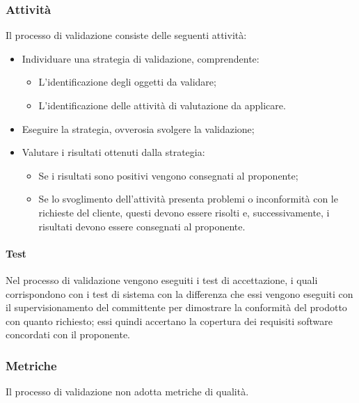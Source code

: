 \documentclass[../norme-di-progetto.tex]{subfiles}
\begin{document}
\subsubsection{Attività}
Il processo di validazione consiste delle seguenti attività:
\begin{itemize}
  \item Individuare una strategia di validazione, comprendente:
  \begin{itemize}
    \item L'identificazione degli oggetti da validare;
    \item L'identificazione delle attività di valutazione da applicare.
  \end{itemize}
  \item Eseguire la strategia, ovverosia svolgere la validazione;
  \item Valutare i risultati ottenuti dalla strategia:
  \begin{itemize}
    \item Se i risultati sono positivi vengono consegnati al proponente;
    \item Se lo svoglimento dell'attività presenta problemi o inconformità con le richieste del cliente, questi devono essere risolti e, successivamente, i risultati devono essere consegnati al proponente.
  \end{itemize}
\end{itemize}
\paragraph{Test}
Nel processo di validazione vengono eseguiti i test di accettazione, i quali corrispondono con i test di sistema con la differenza che essi vengono eseguiti con il supervisionamento del committente per dimostrare la conformità del prodotto con quanto richiesto; essi quindi accertano la copertura dei requisiti software concordati con il proponente.

\subsubsection{Metriche}
Il processo di validazione non adotta metriche di qualità.
\end{document}
